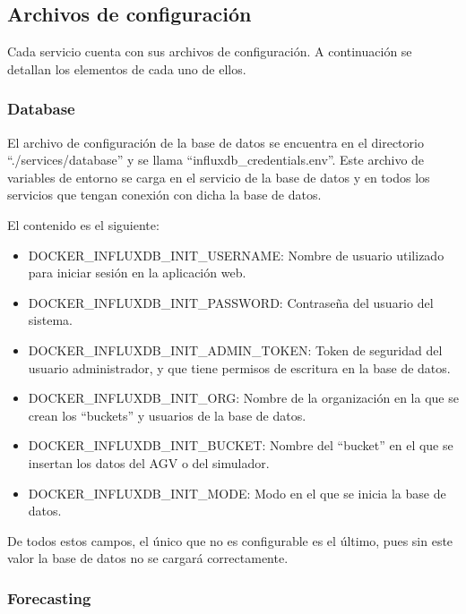 \subsection{Archivos de configuración}

Cada servicio cuenta con sus archivos de configuración. A continuación se detallan los elementos 
de cada uno de ellos.

\subsubsection{Database}
El archivo de configuración de la base de datos se encuentra en el directorio ``./services/database'' 
y se llama ``influxdb\_credentials.env''. Este archivo de variables de entorno se carga en el servicio 
de la base de datos y en todos los servicios que tengan conexión con dicha la base de datos.

El contenido es el siguiente:
\begin{itemize}
    \item DOCKER\_INFLUXDB\_INIT\_USERNAME: Nombre de usuario utilizado para iniciar sesión en la aplicación web.
    \item DOCKER\_INFLUXDB\_INIT\_PASSWORD: Contraseña del usuario del sistema.
    \item DOCKER\_INFLUXDB\_INIT\_ADMIN\_TOKEN: Token de seguridad del usuario administrador, y que tiene permisos 
        de escritura en la base de datos.
    \item DOCKER\_INFLUXDB\_INIT\_ORG: Nombre de la organización en la que se crean los ``buckets'' y usuarios de
        la base de datos.
    \item DOCKER\_INFLUXDB\_INIT\_BUCKET: Nombre del ``bucket'' en el que se insertan los datos del AGV o del simulador.
    \item DOCKER\_INFLUXDB\_INIT\_MODE: Modo en el que se inicia la base de datos.
\end{itemize}
De todos estos campos, el único que no es configurable es el último, pues sin este valor la base de datos 
no se cargará correctamente.

\subsubsection{Forecasting}

